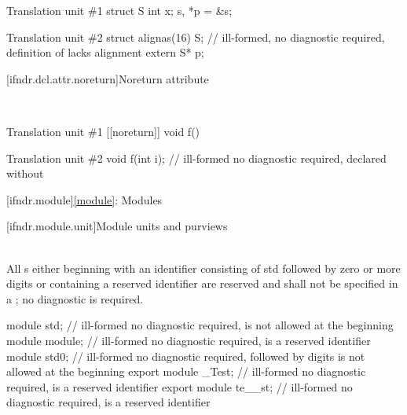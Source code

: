 \pnum
\begin{example}
\begin{codeblocktu}{Translation unit \#1}
struct S { int x; } s, *p = &s;
\end{codeblocktu}
\begin{codeblocktu}{Translation unit \#2}
struct alignas(16) S;   // ill-formed, no diagnostic required, definition of  lacks alignment
extern S* p;
\end{codeblocktu}
\end{example}

[ifndr.dcl.attr.noreturn]{Noreturn attribute}

\pnum
{} \\

\pnum
\begin{example}
\begin{codeblocktu}{Translation unit \#1}
[[noreturn]] void f() {}
\end{codeblocktu}
\begin{codeblocktu}{Translation unit \#2}
void f(int i);          // ill-formed no diagnostic required, declared without 
\end{codeblocktu}
\end{example}

[ifndr.module]{\ref{module}: Modules}

[ifndr.module.unit]{Module units and purviews}

\pnum
{} \\
All s either beginning with an identifier consisting of
std followed by zero or more digits or containing a reserved identifier are reserved and shall not be
specified in a ; no diagnostic is required.

\pnum
\begin{example}
\begin{codeblock}
module std;             // ill-formed no diagnostic required,  is not allowed at the beginning
module module;          // ill-formed no diagnostic required,  is a reserved identifier
module std0;            // ill-formed no diagnostic required,  followed by digits is not allowed at the beginning
export module _Test;    // ill-formed no diagnostic required,  is a reserved identifier
export module te__st;   // ill-formed no diagnostic required,  is a reserved identifier
\end{codeblock}
\end{example}



